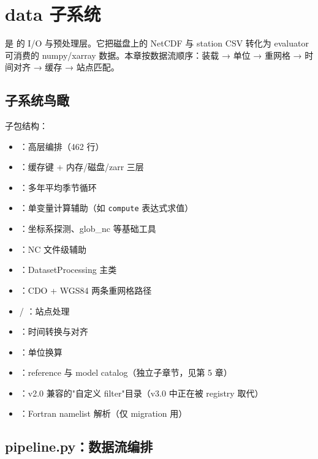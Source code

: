 
\chapter{data 子系统}

 是 \openbench{} 的 I/O 与预处理层。它把磁盘上的 NetCDF 与 station CSV 转化为 evaluator 可消费的 numpy/xarray 数据。本章按数据流顺序：装载 → 单位 → 重网格 → 时间对齐 → 缓存 → 站点匹配。

\section{子系统鸟瞰}

 子包结构：

\begin{itemize}
  \item {}：高层编排（462 行）
  \item {}：缓存键 + 内存/磁盘/zarr 三层
  \item {}：多年平均季节循环
  \item {}：单变量计算辅助（如 \texttt{compute} 表达式求值）
  \item {}：坐标系探测、glob\_nc 等基础工具
  \item {}：NC 文件级辅助
  \item {}：DatasetProcessing 主类
  \item {}：CDO + WGS84 两条重网格路径
  \item {} / ：站点处理
  \item {}：时间转换与对齐
  \item {}：单位换算
  \item {}：reference 与 model catalog（独立子章节，见第 5 章）
  \item {}：v2.0 兼容的"自定义 filter"目录（v3.0 中正在被 registry 取代）
  \item {}：Fortran namelist 解析（仅 migration 用）
\end{itemize}

\section{pipeline.py：数据流编排}


